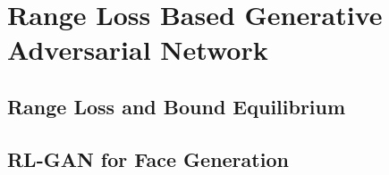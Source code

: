 
\chapter{Range Loss Based Generative Adversarial Network} %

\label{Chapter3} %


\section{Range Loss and Bound Equilibrium}



\section{RL-GAN for Face Generation}


